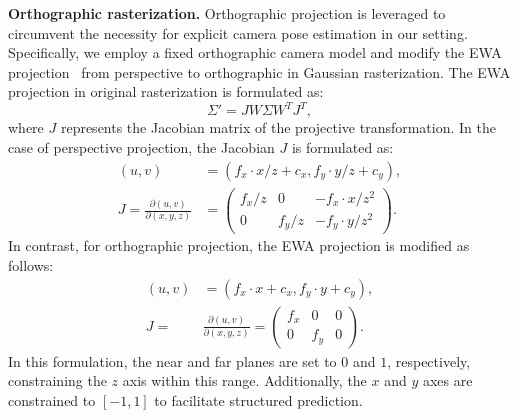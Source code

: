 \noindent\textbf{Orthographic rasterization.}
Orthographic projection is leveraged to circumvent the necessity for explicit camera pose estimation in our setting. 
%
Specifically, we employ a fixed orthographic camera model and modify the EWA projection~\cite{zwicker2002ewa} from perspective to orthographic in Gaussian rasterization. The EWA projection in original rasterization is formulated as:
\begin{equation}
\Sigma' = J W \Sigma W^T J^T,
\end{equation}
where \(J\) represents the Jacobian matrix of the projective transformation. In the case of perspective projection, the Jacobian \(J\) is formulated as:
%
\begin{equation}
\begin{aligned}
(u, v) &= \left( f_x \cdot x / z + c_x, f_y \cdot y / z + c_y \right), \\
J = \frac{\partial(u, v)}{\partial(x, y, z)} &= 
\begin{pmatrix}
f_x / z & 0 & -f_x \cdot x / z^2 \\
0 & f_y / z & -f_y \cdot y / z^2
\end{pmatrix}.
\end{aligned}
\end{equation}
In contrast, for orthographic projection, the EWA projection is modified as follows:
\begin{equation}
\begin{aligned}
(u, v) &= \left( f_x \cdot x + c_x, f_y \cdot y + c_y \right), \\
J = &\frac{\partial(u, v)}{\partial(x, y, z)} = 
\begin{pmatrix}
f_x & 0 & 0 \\
0 & f_y & 0
\end{pmatrix}.
\end{aligned}
\end{equation}
In this formulation, the near and far planes are set to $0$ and $1$, respectively, constraining the $z$ axis within this range. Additionally, the $x$ and $y$ axes are constrained to $[-1, 1]$ to facilitate structured prediction.





